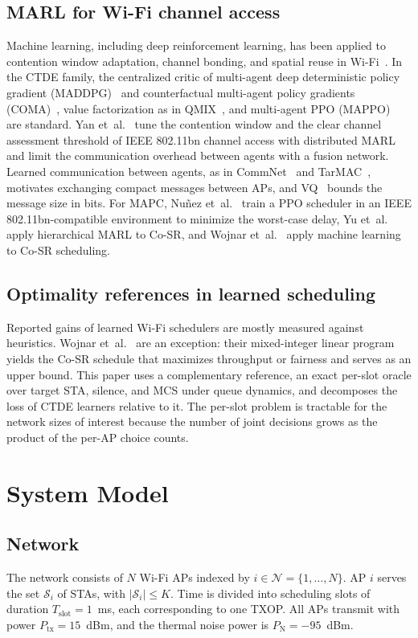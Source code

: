 \documentclass{ieeeaccess}
\begin{document}
\subsection{MARL for Wi-Fi channel access}
Machine learning, including deep reinforcement learning, has been applied to contention window adaptation, channel bonding, and spatial reuse in Wi-Fi~\cite{szott2022wifiml}. In the CTDE family, the centralized critic of multi-agent deep deterministic policy gradient (MADDPG)~\cite{lowe2017maddpg} and counterfactual multi-agent policy gradients (COMA)~\cite{foerster2018coma}, value factorization as in QMIX~\cite{rashid2018qmix}, and multi-agent PPO (MAPPO)~\cite{yu2022mappo} are standard. Yan et~al.~\cite{yan2025marl} tune the contention window and the clear channel assessment threshold of IEEE 802.11bn channel access with distributed MARL and limit the communication overhead between agents with a fusion network. Learned communication between agents, as in CommNet~\cite{sukhbaatar2016commnet} and TarMAC~\cite{das2019tarmac}, motivates exchanging compact messages between APs, and VQ~\cite{vandenoord2017vqvae} bounds the message size in bits. For MAPC, Nu\~{n}ez et~al.~\cite{nunez2026drl} train a PPO scheduler in an IEEE 802.11bn-compatible environment to minimize the worst-case delay, Yu et~al.~\cite{yu2025hmarl} apply hierarchical MARL to Co-SR, and Wojnar et~al.~\cite{wojnar2025csr} apply machine learning to Co-SR scheduling.

\subsection{Optimality references in learned scheduling}
Reported gains of learned Wi-Fi schedulers are mostly measured against heuristics. Wojnar et~al.~\cite{wojnar2025csr} are an exception: their mixed-integer linear program yields the Co-SR schedule that maximizes throughput or fairness and serves as an upper bound. This paper uses a complementary reference, an exact per-slot oracle over target STA, silence, and MCS under queue dynamics, and decomposes the loss of CTDE learners relative to it. The per-slot problem is tractable for the network sizes of interest because the number of joint decisions grows as the product of the per-AP choice counts.

\section{System Model}
\label{sec:system}
\subsection{Network}
The network consists of $N$ Wi-Fi APs indexed by $i \in \mathcal{N} = \{1,\dots,N\}$. AP $i$ serves the set $\mathcal{S}_i$ of STAs, with $|\mathcal{S}_i| \le K$. Time is divided into scheduling slots of duration $T_{\text{slot}} = 1$~ms, each corresponding to one TXOP. All APs transmit with power $P_{\text{tx}} = 15$~dBm, and the thermal noise power is $P_{\text{N}} = -95$~dBm.
\end{document}

